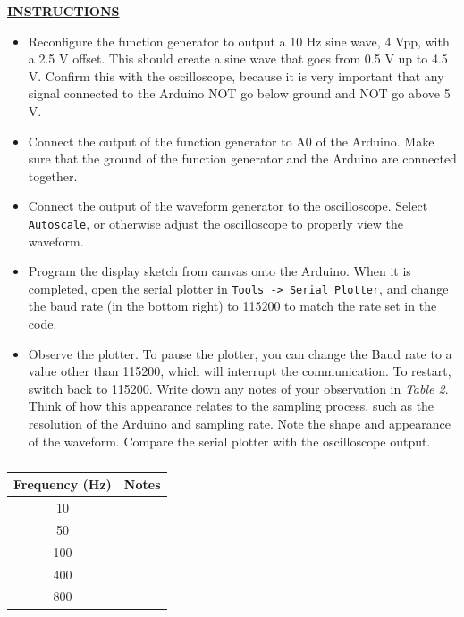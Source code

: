 \documentclass[12pt]{article}
\begin{document}
\textbf{\underline{INSTRUCTIONS}}
\begin{itemize}
    \item Reconfigure the function generator to output a 10 Hz sine wave, 4 Vpp, with a 2.5 V offset.  This should create a sine wave that goes from 0.5 V up to 4.5 V.  Confirm this with the oscilloscope, because it is very important that any signal connected to the Arduino NOT go below ground and NOT go above 5 V.
    \item Connect the output of the function generator to A0 of the Arduino.  Make sure that the ground of the function generator and the Arduino are connected together.
    \item Connect the output of the waveform generator to the oscilloscope. Select \texttt{Autoscale}, or otherwise adjust the oscilloscope to properly view the waveform.
    \item Program the display sketch from canvas onto the Arduino. When it is completed, open the serial plotter in \texttt{Tools -> Serial Plotter}, and change the baud rate (in the bottom right) to 115200 to match the rate set in the code.
    \item Observe the plotter. To pause the plotter, you can change the Baud rate to a value other than 115200, which will interrupt the communication. To restart, switch back to 115200.  Write down any notes of your observation in \textit{Table 2}. Think of how this appearance relates to the sampling process, such as the resolution of the Arduino and sampling rate. Note the shape and appearance of the waveform. Compare the serial plotter with the oscilloscope output.
\end{itemize}

\begin{table}[H]
    \centering
    \begin{tabular}{|c|c|} 
        \hline
        Frequency (Hz) & \hspace{5cm} Notes \hspace{5cm} \\ \hline \hline
        10   &      
        \\ \hline
        50     &       
        \\ \hline 
        100       &        
        \\ \hline 
        400      &       \\ \hline 
        800      &     \\ \hline
    \end{tabular}
    \caption{}
\end{table}
\end{document}
